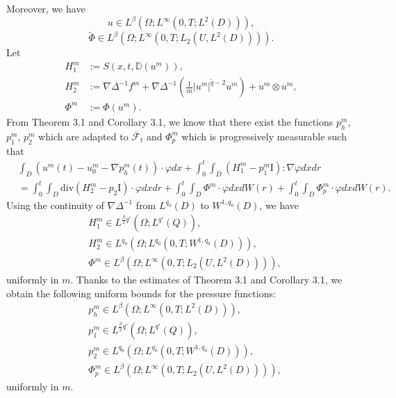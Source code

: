 \documentclass[reqno]{amsart}
\theoremstyle{definition}
\theoremstyle{remark}
\numberwithin{equation}{section} \allowdisplaybreaks
\begin{document}
Moreover, we have
$$u\in L^{\beta}(\Omega;L^{\infty}(0,T;L^2(D))),$$
$$\tilde{\Phi}\in L^\beta (\Omega;L^\infty(0,T;L_2({U},L^2(D)))).$$
Let
\begin{align*}
H_1^m&:=S(x,t,\mathbb{D}(u^m)),\\
H_2^m&:=\nabla\Delta^{-1}f^m+\nabla\Delta^{-1}\left(\frac{1}{m}|u^m|^{\tilde{q}-2}u^m\right)+u^m\otimes
u^m,\\
\Phi^m&:=\Phi(u^m).
\end{align*}
{From Theorem 3.1 and
Corollary 3.1, we know that there exist the functions} $p_h^m$,
$p_1^m$, $p_2^m$ which are adapted to $\overline{\mathscr{F}}_t$ and
$\Phi_p^m$ which is progressively measurable such that
\begin{equation}\label{5.12}
\begin{split}
&\int_{D}(u^m(t)-u^m_0-\nabla p^m_h(t))\cdot\varphi dx+\int_0^t\!\!\!\int_{D}(H_1^m-p_1^m\text{I}):\nabla\varphi dxdr\\
&=\int_0^t\!\!\!\int_{D}\text{div}(H_2^m-p_2\text{I})\cdot\varphi
dxdr+\int_0^t\!\!\!\int_{D}\Phi^m\cdot\varphi dxdW(r)
+\int_0^t\!\!\!\int_{D}\Phi_p^m \cdot\varphi dxdW(r).
\end{split}
\end{equation}
Using the continuity of $\nabla\Delta^{-1}$ from $L^{q_0}(D)$ to
$W^{1,q_0}(D)$, we have
\begin{align}\label{5.13}
&H_1^m\in L^{\frac{\beta}{2}q'}(\Omega;L^{q'}(Q)),\\
\label{5.14}
&H_2^m\in L^{q_0}(\Omega;L^{q_0}(0,T;W^{1,q_0}(D))),\\
\label{5.15}
&\Phi^m \in  L^\beta (\Omega;L^\infty(0,T;L_2({U},L^2(D)))),
\end{align}
uniformly in $m$. Thanks to the estimates of Theorem 3.1 and
Corollary 3.1, we obtain the following uniform bounds for the
pressure functions:
\begin{align}\label{5.16}
&p_h^m \in  L^\beta (\Omega;L^\infty(0,T;L^2(D))),\\
\label{5.17}
&p_1^m\in L^{\frac{\beta}{2}q'}(\Omega;L^{q'}(Q)),\\
\label{5.18}
&p_2^m\in L^{q_0}(\Omega;L^{q_0}(0,T;W^{1,q_0}(D))),\\
\label{5.19}
&\Phi_p^m \in  L^\beta (\Omega;L^\infty(0,T;L_2({U},L^2(D)))),
\end{align}
uniformly in $m$.
\end{document}
